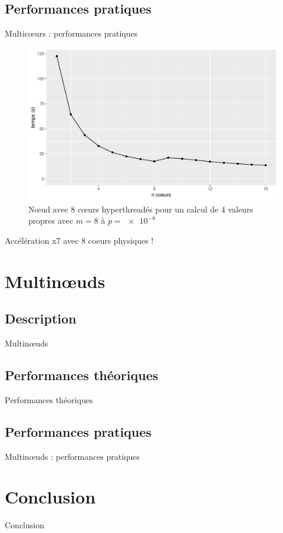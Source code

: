 \documentclass[9.5pt]{beamer}
\begin{document}
	\subsection{Performances pratiques}
		\begin{frame}{Multic\oe{}urs : performances pratiques}
			\begin{figure}
				\includegraphics[width=0.6\linewidth]{../rapport/plots/omp_perf.pdf}
				\caption{Nœud avec 8 cœurs hyperthreadés pour un calcul de 4 valeurs propres avec $m = 8$ à $p=\SI{e-8}{}$ \label{fig:omp_perf}}
			\end{figure}
			\centering
			Accélération x7 avec 8 coeurs physiques !
		\end{frame}

\section{Multin\oe{}uds}
	\subsection{Description}
		\begin{frame}{Multin\oe{}uds}

		\end{frame}

	\subsection{Performances théoriques}
		\begin{frame}{Performances théoriques}

		\end{frame}

	\subsection{Performances pratiques}

		\begin{frame}{Multin\oe{}uds : performances pratiques}

		\end{frame}

\section{Conclusion}
	\begin{frame}{Conclusion}

	\end{frame}
\end{document}
